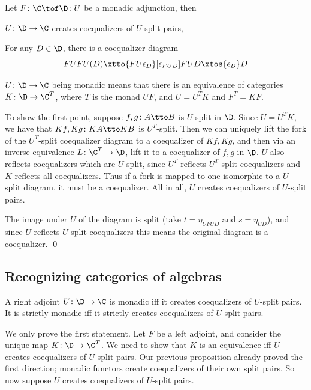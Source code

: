 \eproof

\bcoro

    Let $F\colon\C\tof\D\colon U$ be a monadic adjunction, then
    \benum
        \item $U\colon\D\to\C$ creates coequalizers of $U$-split pairs,
        \item For any $D\in\D$, there is a coequalizer diagram
        $$ FUFU(D)\xtto{FU\epsilon_D}[\epsilon_{FUD}]FUD\xtos{\epsilon_D}D $$
    \eenum

\ecoro

\bproof

    $U\colon\D\to\C$ being monadic means that there is an equivalence of categories $K\colon\D\to\C^T$, where $T$ is the monad $UF$, and $U=U^TK$ and $F^T=KF$.

    To show the first point, suppose $f,g\colon A\tto B$ is $U$-split in $\D$.
    Since $U=U^TK$, we have that $Kf,Kg\colon KA\tto KB$ is $U^T$-split.
    Then we can uniquely lift the fork of the $U^T$-split coequalizer diagram to a coequalizer of $Kf,Kg$, and then via an inverse equivalence $L\colon\C^T\to\D$, lift it to a
    coequalizer of $f,g$ in $\D$.
    $U$ also reflects coequalizers which are $U$-split, since $U^T$ reflects $U^T$-split coequalizers and $K$ reflects all coequalizers.
    Thus if a fork is mapped to one isomorphic to a $U$-split diagram, it must be a coequalizer.
    All in all, $U$ creates coequalizers of $U$-split pairs.

    The image under $U$ of the diagram is split (take $t=\eta_{UFUD}$ and $s=\eta_{UD}$), and since $U$ reflects $U$-split coequalizers this means the original diagram
    is a coequalizer.
    \qed

\eproof

\subsection{Recognizing categories of algebras}

\bthrm

    A right adjoint $U\colon\D\to\C$ is monadic iff it creates coequalizers of $U$-split pairs.
    It is strictly monadic iff it strictly creates coequalizers of $U$-split pairs.

\ethrm

\bproof

    We only prove the first statement.
    Let $F$ be a left adjoint, and consider the unique map $K\colon\D\to\C^T$.
    We need to show that $K$ is an equivalence iff $U$ creates coequalizers of $U$-split pairs.
    Our previous proposition already proved the first direction; monadic functors create coequalizers of their own split pairs.
    So now suppose $U$ creates coequalizers of $U$-split pairs.

